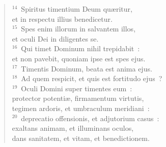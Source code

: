 \begin{verse}${}^{14}$~Spiritus timentium Deum qu\ae ritur,\\ et in respectu illius benedicetur.\\
${}^{15}$~Spes enim illorum in salvantem illos,\\ et oculi Dei in diligentes se.\\
${}^{16}$~Qui timet Dominum nihil trepidabit~:\\ et non pavebit, quoniam ipse est spes ejus.\\
${}^{17}$~Timentis Dominum, beata est anima ejus.\\
${}^{18}$~Ad quem respicit, et quis est fortitudo ejus~?\\
${}^{19}$~Oculi Domini super timentes eum~:\\ protector potenti\ae , firmamentum virtutis,\\ tegimen ardoris, et umbraculum meridiani~:\\
${}^{20}$~deprecatio offensionis, et adjutorium casus~:\\ exaltans animam, et illuminans oculos,\\ dans sanitatem, et vitam, et benedictionem.\end{verse}


